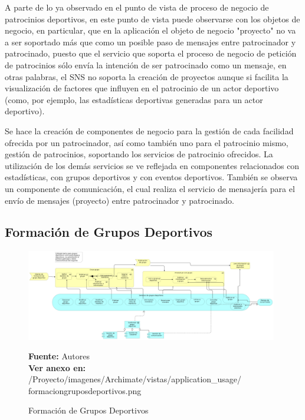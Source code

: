 A parte de lo ya observado en el punto de vista de proceso de negocio de patrocinios deportivos, en este punto de vista puede observarse con los objetos de negocio, en particular, que en la aplicación el objeto de negocio "proyecto" no va a ser soportado más que como un posible paso de mensajes entre patrocinador y patrocinado, puesto que el servicio que soporta el proceso de negocio de petición de patrocinios sólo envía la intención de ser patrocinado como un mensaje, en otras palabras, el SNS no soporta la creación de proyectos aunque si facilita la visualización de factores que influyen en el patrocinio de un actor deportivo (como, por ejemplo, las estadísticas deportivas generadas para un actor deportivo).

Se hace la creación de componentes de negocio para la gestión de cada facilidad ofrecida por un patrocinador, así como también uno para el patrocinio mismo, gestión de patrocinios, soportando los servicios de patrocinio ofrecidos. La utilización de los demás servicios se ve reflejada en componentes relacionados con estadísticas, con grupos deportivos y con eventos deportivos. También se observa un componente de comunicación, el cual realiza el servicio de mensajería para el envío de mensajes (proyecto) entre patrocinador y patrocinado.

\subsection{Formación de Grupos Deportivos}

\begin{figure}[!htb]
  \begin{center}
    \includegraphics[width=11cm]{./imagenes/Archimate/vistas/application_usage/formaciongruposdeportivos.png}
    \caption{Formación de Grupos Deportivos}
    \label{fig:au_formacion_grupos_deportivos}
    \textbf{Fuente:}  Autores \\
    \textbf{Ver anexo en:} /Proyecto/imagenes/Archimate/vistas/application\_usage/
    formaciongruposdeportivos.png
  \end{center}
\end{figure}

